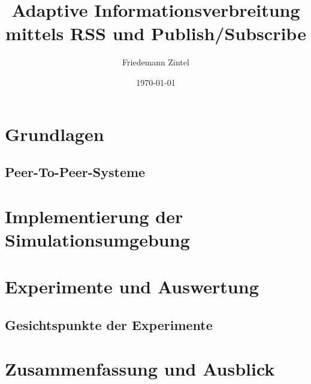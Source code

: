 \documentclass{scrbook}
\title{Adaptive Informationsverbreitung mittels RSS und Publish/Subscribe}
\author{Friedemann Zintel}
\date{\today}
\begin{document}

\maketitle


%

\frontmatter

\setcounter{tocdepth}{3}
\tableofcontents
\listoffigures

\mainmatter


\chapter{Grundlagen}

\section{Peer-To-Peer-Systeme}


\chapter{Implementierung der Simulationsumgebung}
\chapter{Experimente und Auswertung}
\section{Gesichtspunkte der Experimente}
\chapter{Zusammenfassung und Ausblick}

\backmatter




\end{document}
